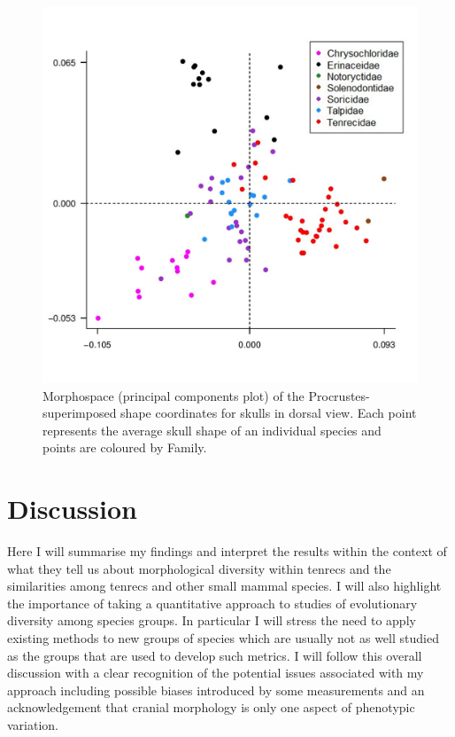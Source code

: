 \documentclass[12pt,a4paper]{article}
\begin{document}
  \begin{figure}[H]
	\centering
	\includegraphics[width=\textwidth, height=\textheight, keepaspectratio=true]{skdors_allfam_PCA_legend.png}
		\caption{Morphospace (principal components plot) of the Procrustes-superimposed shape coordinates for skulls in dorsal view. Each point represents the average skull shape of an individual species and points are coloured by Family.}
	\label{fig:skdors_pca}
  \end{figure}


\section{Discussion}
	
	Here I will summarise my findings and interpret the results within the context of what they tell us about morphological diversity within tenrecs and the similarities among tenrecs and other small mammal species. I will also highlight the importance of taking a quantitative approach to studies of evolutionary diversity among species groups. In particular I will stress the need to apply existing methods to new groups of species which are usually not as well studied as the groups that are used to develop such metrics. 
	I will follow this overall discussion with a clear recognition of the potential issues associated with my approach including possible biases introduced by some measurements and an acknowledgement that cranial morphology is only one aspect of phenotypic variation.
	
\end{document}
